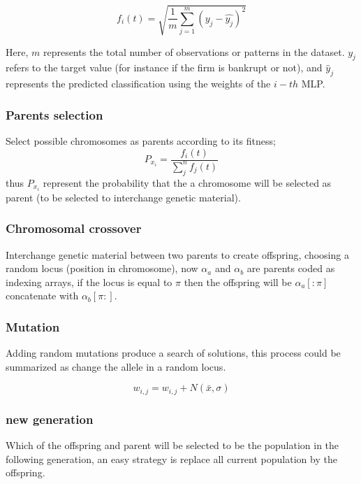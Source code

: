 \documentclass[journal]{IEEEtai}
\begin{document}
\begin{equation}
    f_{i}(t) = \sqrt{ \frac{1}{m} \sum_{j=1}^{m}  (y_{j} - \hat{y_{j}})^{2}}
\end{equation}

Here, $m$ represents the total number of observations or patterns in the dataset. $y_{j}$ refers to the target value (for instance if the firm is bankrupt or not), and $\hat{y}_{j}$ represents the predicted classification using the weights of the $i-th$ MLP.

\subsubsection{Parents selection}
Select possible chromosomes as parents according to its fitness;
\begin{equation}
P_{x_{i}} = \frac{f_{i}(t)}{\sum_{j}^{n} f_{j}(t)}
\end{equation}
thus $P_{x_{i}}$ represent the probability that the a chromosome will be selected as parent (to be selected to interchange genetic material).

\subsubsection{Chromosomal crossover}
Interchange genetic material between two parents to create offspring,  choosing a random locus (position in chromosome), now  $\alpha_{a}$ and $\alpha_{b}$ are parents coded as indexing arrays, if the locus is equal to $\pi$ then the offspring will be $\alpha_{a}[: \pi]$  concatenate with $\alpha_{b}[\pi:]$.

\subsubsection{Mutation}
Adding random mutations produce a search of solutions, this process could be summarized as change the allele in a random locus.

\begin{equation}
w_{i,j}  = w_{i,j} + N(\bar{x},\sigma)
\end{equation}

\subsubsection{new generation}
Which of the offspring and parent will be selected to be the population in the following generation, an easy strategy is replace all current population by the offspring.
\end{document}
